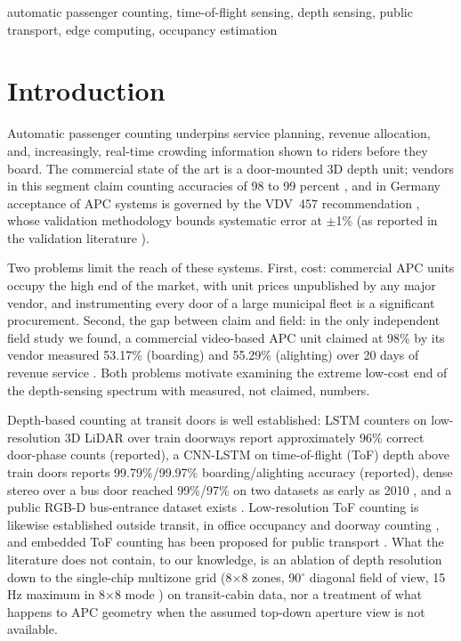 \documentclass[conference]{IEEEtran}
\begin{document}
\begin{IEEEkeywords}
automatic passenger counting, time-of-flight sensing, depth sensing, public
transport, edge computing, occupancy estimation
\end{IEEEkeywords}

\section{Introduction}
\label{sec:intro}

Automatic passenger counting underpins service planning, revenue allocation,
and, increasingly, real-time crowding information shown to riders before they
board. The commercial state of the art is a door-mounted 3D depth unit; vendors
in this segment claim counting accuracies of 98 to 99 percent
\cite{irma,dilax}, and in Germany acceptance of APC systems is governed by the
VDV~457 recommendation \cite{vdv457}, whose validation methodology bounds
systematic error at $\pm$1\% (as reported in the validation literature
\cite{ellenberger2023}).

Two problems limit the reach of these systems. First, cost: commercial APC
units occupy the high end of the market, with unit prices unpublished by any
major vendor, and instrumenting every door of a large municipal fleet is a
significant procurement. Second, the gap between claim and field: in the only
independent field study we found, a commercial video-based APC unit claimed at
98\% by its vendor measured 53.17\% (boarding) and 55.29\% (alighting) over 20
days of revenue service \cite{pronello2023}. Both problems motivate examining
the extreme low-cost end of the depth-sensing spectrum with measured, not
claimed, numbers.

Depth-based counting at transit doors is well established: LSTM counters on
low-resolution 3D LiDAR over train doorways report approximately 96\% correct
door-phase counts \cite{seidel2021} (reported), a CNN-LSTM on time-of-flight
(ToF) depth above train doors reports 99.79\%/99.97\% boarding/alighting
accuracy \cite{seo2026} (reported), dense stereo over a bus door reached
99\%/97\% on two datasets as early as 2010 \cite{yahiaoui2010}, and a public
RGB-D bus-entrance dataset exists \cite{sun2019}. Low-resolution ToF counting
is likewise established outside transit, in office occupancy \cite{lu2021} and
doorway counting \cite{jeong2025}, and embedded ToF counting has been proposed
for public transport \cite{stec2019}. What the literature does not contain, to
our knowledge, is an ablation of depth resolution down to the single-chip
multizone grid (8$\times$8 zones, 90$^\circ$ diagonal field of view, 15\,Hz
maximum in 8$\times$8 mode \cite{st_vl53l7cx}) on transit-cabin data, nor a
treatment of what happens to APC geometry when the assumed top-down aperture
view is not available.
\end{document}

